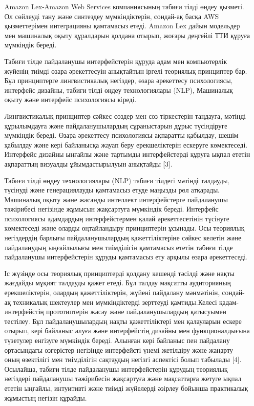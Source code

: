Amazon Lex-Amazon Web Services компаниясының табиғи тілді өңдеу қызметі.
Ол сөйлеуді тану және синтездеу мүмкіндіктерін, сондай-ақ басқа AWS
қызметтерімен интеграцияны қамтамасыз етеді. Amazon Lex дайын модельдер
мен машиналық оқыту құралдарын қолдана отырып, жоғары деңгейлі ТТИ
құруға мүмкіндік береді.

Табиғи тілде пайдаланушы интерфейстерін құруда адам мен компьютерлік
жүйенің тиімді өзара әрекеттесуін анықтайтын іргелі теориялық принциптер
бар. Бұл принциптерге лингвистикалық негіздер, өзара әрекеттесу
психологиясы, интерфейс дизайны, табиғи тілді өңдеу технологиялары
(NLP), Машиналық оқыту және интерфейс психологиясы кіреді.

Лингвистикалық принциптер сәйкес сөздер мен сөз тіркестерін таңдауға,
мәтінді құрылымдауға және пайдаланушылардың сұраныстарын дұрыс
түсіндіруге мүмкіндік береді. Өзара әрекеттесу психологиясы ақпаратты
қабылдау, шешім қабылдау және кері байланысқа жауап беру ерекшеліктерін
ескеруге көмектеседі. Интерфейс дизайны ыңғайлы және тартымды
интерфейстерді құруға ықпал ететін ақпараттың визуалды ұйымдастырылуын
анықтайды {[}3{]}.

Табиғи тілді өңдеу технологиялары (NLP) табиғи тілдегі мәтінді талдауды,
түсінуді және генерациялауды қамтамасыз етуде маңызды рөл атқарады.
Машиналық оқыту және жасанды интеллект интерфейстерге пайдаланушы
тәжірибесі негізінде жұмысын жақсартуға мүмкіндік береді. Интерфейс
психологиясы адамдардың интерфейстермен қалай әрекеттесетінін түсінуге
көмектеседі және оларды оңтайландыру принциптерін ұсынады. Осы теориялық
негіздердің барлығы пайдаланушылардың қажеттіліктеріне сәйкес келетін
және пайдаланудың ыңғайлылығы мен тиімділігін қамтамасыз ететін табиғи
тілде пайдаланушы интерфейстерін құруды қамтамасыз ету арқылы өзара
әрекеттеседі.

Іс жүзінде осы теориялық принциптерді қолдану кешенді тәсілді және нақты
жағдайды мұқият талдауды қажет етеді. Бұл талдау мақсатты аудиторияның
ерекшеліктерін, олардың қажеттіліктерін, жүйені пайдалану мәнмәтінін,
сондай-ақ техникалық шектеулер мен мүмкіндіктерді зерттеуді
қамтиды.Келесі қадам-интерфейстің прототиптерін жасау және
пайдаланушылардың қатысуымен тестілеу. Бұл пайдаланушылардың нақты
қажеттіліктері мен қалауларын ескере отырып, кері байланыс алуға және
интерфейстің дизайны мен функционалдығына түзетулер енгізуге мүмкіндік
береді. Алынған кері байланыс пен пайдалану ортасындағы өзгерістер
негізінде интерфейсті үнемі жетілдіру және жаңарту оның өзектілігі мен
тиімділігін сақтаудың негізгі аспектісі болып табылады {[}4{]}.
Осылайша, табиғи тілде пайдаланушы интерфейстерін құрудың теориялық
негіздері пайдаланушы тәжірибесін жақсартуға және мақсаттарға жетуге
ықпал ететін ыңғайлы, интуитивті және тиімді жүйелерді әзірлеу бойынша
практикалық жұмыстың негізін құрайды.

